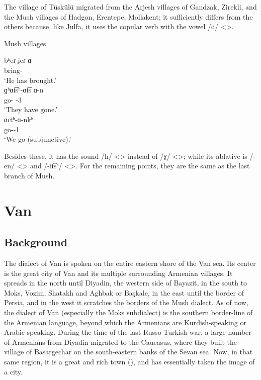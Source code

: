 The village of Tüskülü migrated from the Arjesh villages of Gandzak, Zirekli, and the Mush villages of Hadgon, Erentepe, Mollakent; it sufficiently differs from the others because, like Julfa, it uses the copular verb with the vowel /ɑ/ <>.

\begin{exe}
	\ex Mush villages \label{sent:Mush:textSample:village:Aux}
	\begin{xlist}
		\ex \gll bʰeɾ-i̯eɾ ɑ \\
		bring-{\perfcvb} {\aux} \\
		\trans `He has brought.'\\
		\ex \gll ɡʰɑt͡sʰ-ɑt͡s ɑ-n \\
		go-{\rptcp} {\aux}-3{\pl} \\
		\trans `They have gone.'\\
		\ex \gll ɑɾtʰ-ɑ-nkʰ \\
		go-{\thgloss}-1{\pl} \\
		\trans `We go (subjunctive).'\\
		
	\end{xlist}
\end{exe}


Besides these, it has the sound /h/ <> instead of /χ/ <>; while its ablative is /-en/ <> and /-it͡sʰ/ <>. For the remaining points, they are the same as the last branch of Mush. 




\chapter{Van}\label{chapter:Van}

\section{Background}

\begin{adjarianpage}\label{page:140}\end{adjarianpage}%

The dialect of Van is spoken on the entire eastern shore of the Van sea. Its center is the great city of Van and its multiple surrounding Armenian villages. It spreads in the north until Diyadin, the western side of Bayazit, in the south to Moks, Vozim, Shatakh and Aghbak or Başkale, in the east until the border of Persia, and in the west it scratches the borders of the Mush dialect. As of now, the dialect of Van (especially the Moks subdialect) is the southern border-line of the Armenian language, beyond which the Armenians are Kurdish-speaking or Arabic-speaking. During the time of the last Russo-Turkish war, a large number of Armenians from Diyadin migrated to the Caucasus, where they built the village of Basargechar on the south-eastern banks of the Sevan sea. Now, in that same region, it is a great and rich town (), and has essentially taken the image of a city. 

